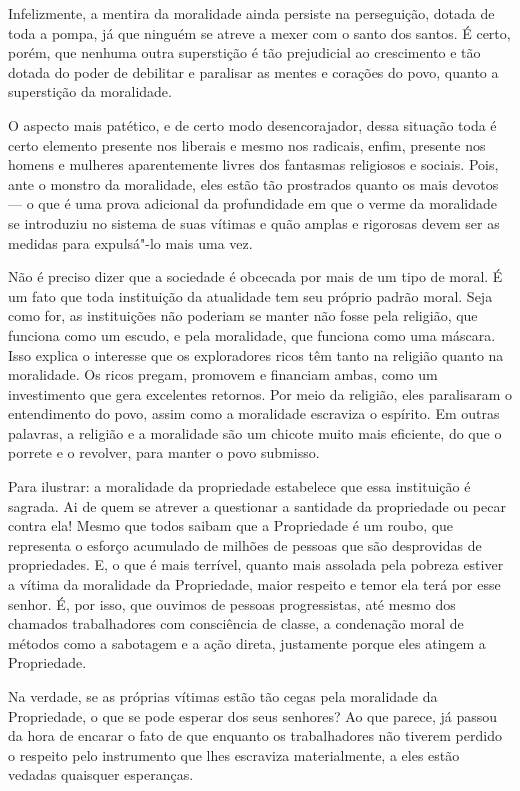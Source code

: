 Infelizmente, a mentira da moralidade ainda persiste na perseguição,
dotada de toda a pompa, já que ninguém se atreve a mexer com o santo dos
santos. É certo, porém, que nenhuma outra superstição é tão prejudicial
ao crescimento e tão dotada do poder de debilitar e paralisar as mentes
e corações do povo, quanto a superstição da moralidade.

O aspecto mais patético, e de certo modo desencorajador, dessa situação
toda é certo elemento presente nos liberais e mesmo nos radicais, enfim,
presente nos homens e mulheres aparentemente livres dos fantasmas
religiosos e sociais. Pois, ante o monstro da moralidade, eles estão tão
prostrados quanto os mais devotos --- o que é uma prova adicional da
profundidade em que o verme da moralidade se introduziu no sistema de
suas vítimas e quão amplas e rigorosas devem ser as medidas para
expulsá"-lo mais uma vez.

Não é preciso dizer que a sociedade é obcecada por mais de um tipo de
moral. É um fato que toda instituição da atualidade tem seu próprio
padrão moral. Seja como for, as instituições não poderiam se manter não
fosse pela religião, que funciona como um escudo, e pela moralidade, que
funciona como uma máscara. Isso explica o interesse que os exploradores
ricos têm tanto na religião quanto na moralidade. Os ricos pregam,
promovem e financiam ambas, como um investimento que gera excelentes
retornos. Por meio da religião, eles paralisaram o entendimento do povo,
assim como a moralidade escraviza o espírito. Em outras palavras, a
religião e a moralidade são um chicote muito mais eficiente, do que o
porrete e o revolver, para manter o povo submisso.

Para ilustrar: a moralidade da propriedade estabelece que essa
instituição é sagrada. Ai de quem se atrever a questionar a santidade da
propriedade ou pecar contra ela! Mesmo que todos saibam que a
Propriedade é um roubo, que representa o esforço acumulado de milhões de
pessoas que são desprovidas de propriedades. E, o que é mais terrível,
quanto mais assolada pela pobreza estiver a vítima da moralidade da
Propriedade, maior respeito e temor ela terá por esse senhor. É, por
isso, que ouvimos de pessoas progressistas, até mesmo dos chamados
trabalhadores com consciência de classe, a condenação moral de métodos
como a sabotagem e a ação direta, justamente porque eles atingem a
Propriedade.

Na verdade, se as próprias vítimas estão tão cegas pela moralidade da
Propriedade, o que se pode esperar dos seus senhores? Ao que parece, já
passou da hora de encarar o fato de que enquanto os trabalhadores não
tiverem perdido o respeito pelo instrumento que lhes escraviza
materialmente, a eles estão vedadas quaisquer esperanças.

